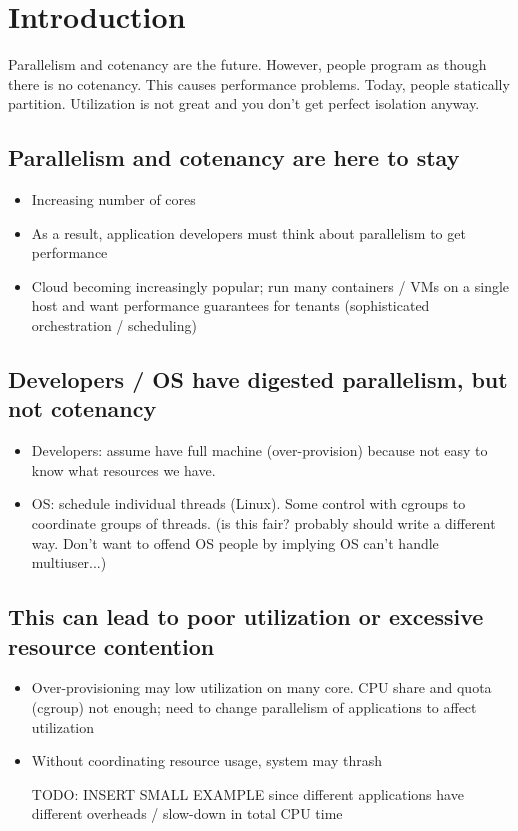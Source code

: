 \section{Introduction}
Parallelism and cotenancy are the future. However, people program as though there is no cotenancy. This causes performance problems. Today, people statically partition. Utilization is not great and you don't get perfect isolation anyway.
\subsection*{Parallelism and cotenancy are here to stay}
\begin{itemize}
  \item Increasing number of cores \cite{baumann2009multikernel}
  \item As a result, application developers must think about parallelism to get performance
  \item Cloud becoming increasingly popular; run many containers / VMs on a single host and want performance guarantees for tenants (sophisticated orchestration / scheduling)
\end{itemize}
\subsection*{Developers / OS have digested parallelism, but not cotenancy}
\begin{itemize}
  \item Developers: assume have full machine (over-provision) because not easy to know what resources we have.
  \item OS: schedule individual threads (Linux). Some control with cgroups to coordinate groups of threads. (is this fair? probably should write a different way. Don't want to offend OS people by implying OS can't handle multiuser...)
\end{itemize}
\subsection*{This can lead to poor utilization or excessive resource contention}
\begin{itemize}
  \item Over-provisioning may low utilization on many core. CPU share and quota (cgroup) not enough; need to change parallelism of applications to affect utilization
  \item Without coordinating resource usage, system may thrash
  \item [TODO: INSERT SMALL EXAMPLE] since different applications have different overheads / slow-down in total CPU time
\end{itemize}
